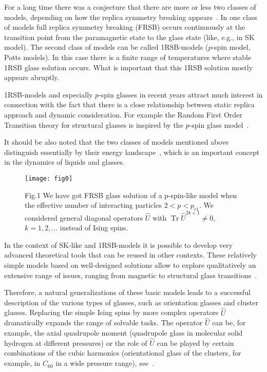 \documentclass{jetpl}
\DeclareMathOperator{\Tr}{Tr}
\begin{document}
For a long time there was a conjecture that there are more or less two classes of models, depending on how the replica symmetry breaking appears~\cite{PRE}. In one class of models full replica symmetry breaking (FRSB) occurs continuously at the transition point from the paramagnetic state to the glass state (like, e.g., in SK model). The second class of models can be called 1RSB-models ($p$-spin model, Potts models). In this case there is a finite range of temperatures where stable 1RSB glass solution occurs. What is important that this 1RSB solution mostly appears abruptly.

1RSB-models and especially $p$-spin glasses in recent years attract much interest in connection with the fact that there is a close relationship between static replica approach and dynamic consideration. For example the Random First Order Transition theory for structural glasses is inspired by the $p$-spin glass model~\cite{F.Zamponi,Cris,Kirk,Kirkp,Franz,F.Caltagirone,Riz,Rizzo,Par,B,Wolynes}.

It should be also noted that the two classes of models mentioned above distinguish essentially by their energy landscape~\cite{U.Buchenau}, which is an important concept in the dynamics of liquids and glasses.
\begin{figure}[b]
  \centering
  \texttt{[image: fig0]}\\
  \caption{Fig.1 We have got FRSB glass solution of a p-spin-like model when the effective number of interacting particles $2<p<p_{c1}$. We considered general diagonal operators $\hat{U}$ with $\Tr\hat{U}^{2k+1} \neq 0$, $k=1,2,...$ instead of Ising spins.\label{fig0}}
\end{figure}

In the context of SK-like and 1RSB-models it is possible  to develop very advanced theoretical tools that can be reused in other contexts. These relatively simple models based on well-designed solutions allow to explore qualitatively an extensive range of issues, ranging from magnetic to structural glass transitions~\cite{F.Zamponi,Cris,Kirk,Kirkp,Franz,F.Caltagirone,Riz,Rizzo,Par,B,Wolynes,U.Buchenau,Alba}.

Therefore, a natural generalizations of these basic models leads to a successful description of the various types of glasses, such as orientation glasses and cluster glasses.  Replacing the simple Ising spins by more complex operators $\hat{U}$ dramatically expands the range of solvable tasks. The operator $\hat{U}$ can be, for example, the axial quadrupole moment (quadrupole  glass in molecular solid hydrogen at different pressures)  or the role of $\hat{U}$ can be played by certain combinations of the cubic harmonics (orientational glass of the clusters, for example, in $C_{60}$ in a wide pressure range), see~\cite{PRE,Prb,C60,L,Chtch,W,ESc,EShc,JPA}.
\end{document}
